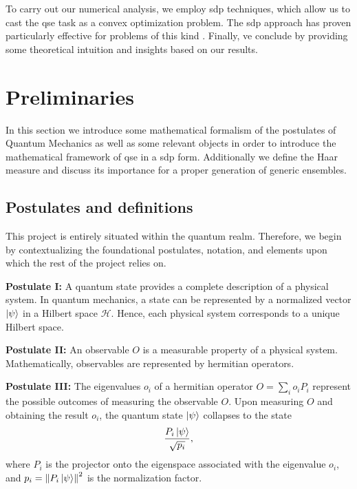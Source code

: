 \documentclass[12pt,letterpaper]{article}
\begin{document}
To carry out our numerical analysis, we employ \gls{sdp} techniques, which allow us to cast the \gls{qse} task as a convex optimization problem. The \gls{sdp} approach has proven particularly effective for problems of this kind \cite{bandyopadhyay2014conclusive}. Finally, ve conclude by providing some theoretical intuition and insights based on our results.

\newpage
\section{Preliminaries}

\hspace{20pt}In this section we introduce some mathematical formalism of the postulates of Quantum Mechanics as well as some relevant objects in order to introduce the mathematical framework of \gls{qse} in a \gls{sdp} form. Additionally we define the Haar measure and discuss its importance for a proper generation of generic ensembles.

\subsection{Postulates and definitions}

\hspace{20pt}This project is entirely situated within the quantum realm. Therefore, we begin by contextualizing the foundational postulates, notation, and elements upon which the rest of the project relies on.

\textbf{Postulate I:} A quantum state provides a complete description of a physical system. In quantum mechanics, a state can be represented by a normalized vector $\ket{\psi}$ in a Hilbert space $\mathcal{H}$. Hence, each physical system corresponds to a unique Hilbert space.

\textbf{Postulate II:} An observable $O$ is a measurable property of a physical system. Mathematically, observables are represented by hermitian operators.

\textbf{Postulate III:} The eigenvalues $o_i$ of a hermitian operator $O = \sum_{i} o_i P_i$ represent the possible outcomes of measuring the observable $O$. Upon measuring $O$ and obtaining the result $o_i$, the quantum state $\ket{\psi}$ collapses to the state
\begin{align*}
	\frac{P_i\ket{\psi}}{\sqrt{p_i}},
\end{align*}
where $P_i$ is the projector onto the eigenspace associated with the eigenvalue $o_i$, and $p_i = \left\|P_i\ket{\psi}\right\|^2$ is the normalization factor.
\end{document}
